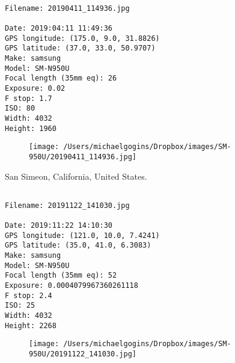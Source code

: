 \clearpage
\onecolumn
\noindent 
\noindent
\begin{lstlisting}

Filename: 20190411_114936.jpg

Date: 2019:04:11 11:49:36
GPS longitude: (175.0, 9.0, 31.8826)
GPS latitude: (37.0, 33.0, 50.9707)
Make: samsung
Model: SM-N950U
Focal length (35mm eq): 26
Exposure: 0.02
F stop: 1.7
ISO: 80
Width: 4032
Height: 1960
\end{lstlisting}
\clearpage

\begin{figure}
\texttt{[image: /Users/michaelgogins/Dropbox/images/SM-950U/20190411\_114936.jpg]}
\end{figure}
    
\clearpage
\onecolumn
\noindent San Simeon, California, United States.
\noindent
\begin{lstlisting}

Filename: 20191122_141030.jpg

Date: 2019:11:22 14:10:30
GPS longitude: (121.0, 10.0, 7.4241)
GPS latitude: (35.0, 41.0, 6.3083)
Make: samsung
Model: SM-N950U
Focal length (35mm eq): 52
Exposure: 0.0004079967360261118
F stop: 2.4
ISO: 25
Width: 4032
Height: 2268
\end{lstlisting}
\clearpage

\begin{figure}
\texttt{[image: /Users/michaelgogins/Dropbox/images/SM-950U/20191122\_141030.jpg]}
\end{figure}
    